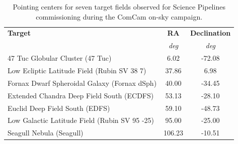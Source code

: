 \begin{table}
    \centering
    \begin{tabular}{@{}lcc@{}}
    \textbf{Target} & \textbf{RA} & \textbf{Declination} \\
     & \textit{deg} & \textit{deg} \\
    \hline
    47 Tuc Globular Cluster (47 Tuc)              & 6.02    & -72.08    \\
    Low Ecliptic Latitude Field (Rubin SV 38 7)   & 37.86   & 6.98      \\
    Fornax Dwarf Spheroidal Galaxy (Fornax dSph)  & 40.00   & -34.45    \\
    Extended Chandra Deep Field South (ECDFS)     & 53.13   & -28.10    \\
    Euclid Deep Field South (EDFS)                & 59.10   & -48.73    \\
    Low Galactic Latitude Field (Rubin SV 95 -25) & 95.00   & -25.00    \\
    Seagull Nebula (Seagull)                      & 106.23  & -10.51    \\
    \end{tabular}
    \caption{Pointing centers for seven target fields observed for Science Pipelines commissioning during the ComCam on-sky campaign.}
    \label{tab:target_fields_pointing_centers}
\end{table}


